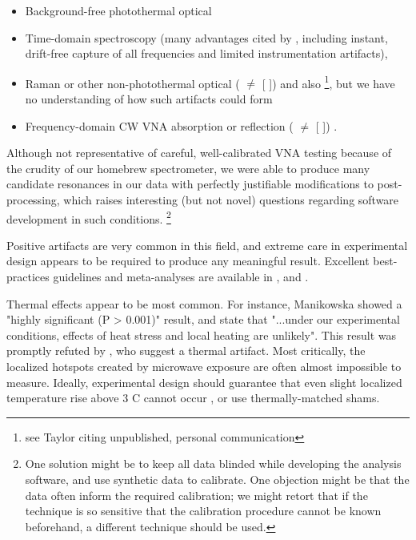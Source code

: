\documentclass[paper.tex]{subfiles}
\begin{document}
\begin{multicols}{1}
\begin{itemize}
\item Background-free photothermal optical \cite{Microwave1993a}\cite{Broadband1988}
\item Time-domain spectroscopy (many advantages cited by \cite{Time2003}, including instant, drift-free capture of all frequencies and limited instrumentation artifacts), \cite{Dielectric2004}\cite{Microwave1994}
\item Raman or other non-photothermal optical (\cite{optical1983} $\neq$ [\cite{Resonances1987} \cite{Dielectric1989}]) and also \footnote{see Taylor \cite{mechanisms1981} citing unpublished, personal communication}, but we have no understanding of how such artifacts could form
\item Frequency-domain CW VNA absorption or reflection (\cite{Microwave1982} $\neq$ [\cite{Resonances1987} \cite{Dielectric1989}]) \cite{Substitution1982} \cite{Millimeter1980}.
\end{itemize}

Although not representative of careful, well-calibrated VNA testing because of the crudity of our homebrew spectrometer, we were able to produce many candidate resonances in our data with perfectly justifiable modifications to post-processing, which raises interesting (but not novel\cite{Reanalysis2020}\cite{statistical2020}) questions regarding software development in such conditions. \footnote{One solution might be to keep all data blinded while developing the analysis software, and use synthetic data to calibrate. One objection might be that the data often inform the required calibration; we might retort that if the technique is so sensitive that the calibration procedure cannot be known beforehand, a different technique should be used.}


Positive artifacts are very common in this field, and extreme care in experimental design appears to be required to produce any meaningful result. Excellent best-practices guidelines and meta-analyses are available in \cite{Biological2016} \cite{Comprehensive2018} \cite{Funding2019}, \cite{chou1996radio} and \cite{Effects2016}.

Thermal effects appear to be most common. For instance, Manikowska\cite{Effects1985a} showed a "highly significant (P > 0.001)" result, and state that "...under our experimental conditions, effects of heat stress and local heating are unlikely". This result was promptly refuted by \cite{Cytogenetic1986}, who suggest a thermal artifact. Most critically, the localized hotspots created by microwave exposure are often almost impossible to measure. Ideally, experimental design should guarantee that even slight localized temperature rise above 3 C cannot occur \cite{Sharp1983}\cite{Effects1951}\cite{DNA2004}, or use thermally-matched shams\cite{Basic1983}.


\end{multicols}
\end{document}

